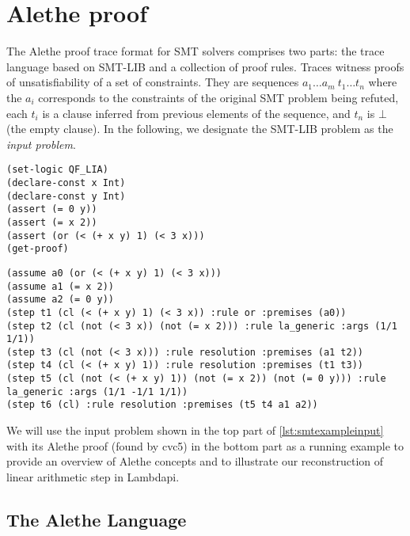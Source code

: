 \section{Alethe proof}
\label{sect:alethe}

The Alethe proof trace format \cite{alethespec} for SMT solvers comprises two parts: the trace language based on SMT-LIB and a collection of proof rules. Traces witness proofs of unsatisfiability of a set of constraints.
They are sequences $a_1 \dots a_m~t_1 \dots t_n$ where
the $a_i$ corresponds to the constraints of the original SMT problem being refuted, each $t_i$ is a clause inferred from previous elements of the sequence, and $t_n$ is $\bot$ (the empty clause).
In the following, we designate the SMT-LIB problem as the \emph{input problem}.

\begin{lstlisting}[language=SMT,label={lst:smtexampleinput}]
(set-logic QF_LIA)
(declare-const x Int)
(declare-const y Int)
(assert (= 0 y))
(assert (= x 2))
(assert (or (< (+ x y) 1) (< 3 x)))
(get-proof)
\end{lstlisting}

\begin{center}
\lightning
\end{center}

\begin{lstlisting}[language=SMT,caption={The following example is the proof for the unsatisfiability of $(x+y < 1) \lor (3<x), x = 2$ and $0 = y$.},label={lst:smtexampleproof}]
(assume a0 (or (< (+ x y) 1) (< 3 x)))
(assume a1 (= x 2))
(assume a2 (= 0 y))
(step t1 (cl (< (+ x y) 1) (< 3 x)) :rule or :premises (a0))
(step t2 (cl (not (< 3 x)) (not (= x 2))) :rule la_generic :args (1/1 1/1))
(step t3 (cl (not (< 3 x))) :rule resolution :premises (a1 t2))
(step t4 (cl (< (+ x y) 1)) :rule resolution :premises (t1 t3))
(step t5 (cl (not (< (+ x y) 1)) (not (= x 2)) (not (= 0 y))) :rule la_generic :args (1/1 -1/1 1/1))
(step t6 (cl) :rule resolution :premises (t5 t4 a1 a2))
\end{lstlisting}

We will use the input problem shown in the top part of \cref{lst:smtexampleinput} with its Alethe proof (found by cvc5) in the bottom part as a running example to provide an overview of Alethe concepts and to illustrate our reconstruction of linear arithmetic step in Lambdapi.

\subsection{The Alethe Language}

